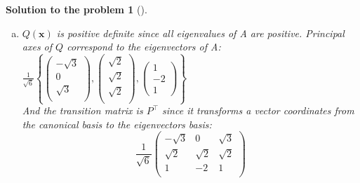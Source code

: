 \documentclass[12pt,a4]{article}
\newtheorem{solution}{Solution to the problem}
\newcommand\rank{\operatorname{rank}}
\newcommand{\bv}{{\mathbf v}}
\newcommand{\bx}{{\mathbf x}}
\newcommand{\by}{{\mathbf y}}
\begin{document}
{\begin{solution}[]
\begin{enumerate}[(a)]
\[\begin{pmatrix}
\sqrt3 & \sqrt2 & 1\\
\end{pmatrix}
\begin{pmatrix}
2 & 0 & 0 \\
0 & 2 & 0 \\
0 & 0 & 8\\
\end{pmatrix}
\frac1{\sqrt6}
\begin{pmatrix}
-\sqrt3 & 0 & \sqrt3\\
\sqrt2 & \sqrt2 & \sqrt2 \\
1 & -2 & 1\\
\end{pmatrix}
\]
	\item
$Q(\bx)$ is positive definite since all eigenvalues of A are positive.
Principal axes of $Q$ correspond to the eigenvectors of A:
$
\frac1{\sqrt6} 
\left \{
\begin{pmatrix}
-\sqrt3\\ 0 \\ \sqrt3 \\
\end{pmatrix}
,
\begin{pmatrix}
\sqrt2\\ \sqrt2 \\ \sqrt2 \\
\end{pmatrix}
,
\begin{pmatrix}
1 \\ -2 \\ 1
\end{pmatrix}
\right \}
$\\[10pt]
And the transition matrix is $P^\top$ since it transforms a vector coordinates from the canonical basis to the eigenvectors basis:
\[
\frac1{\sqrt6}
\begin{pmatrix}
-\sqrt3 & 0 & \sqrt3\\
\sqrt2 & \sqrt2 & \sqrt2 \\
1 & -2 & 1\\
\end{pmatrix}
\]

\end{enumerate}
\end{solution}}
\end{document}
